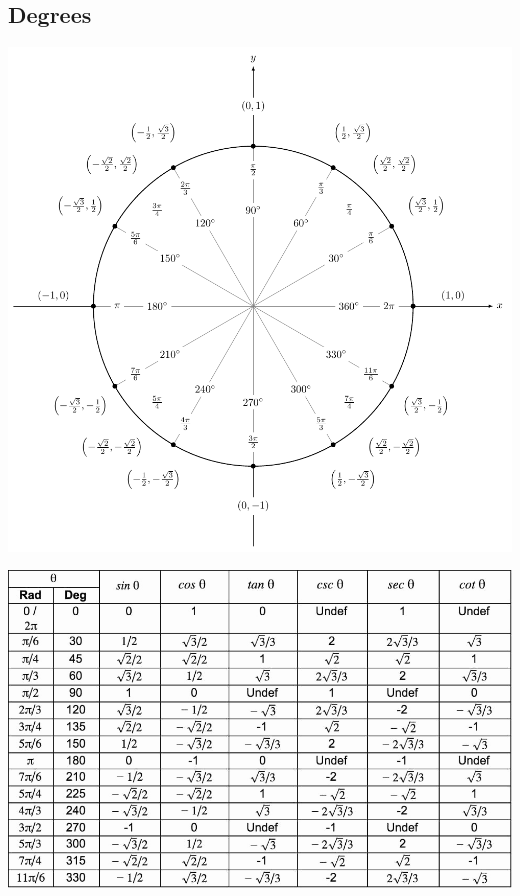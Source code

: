 \subsection*{Degrees}
\begin{Figure}
	\centering
	\includegraphics[width=\linewidth]{degrees_circle}
\end{Figure}

\begin{Figure}
	\centering
	\includegraphics[width=\linewidth]{unit_circle_table}
\end{Figure}
